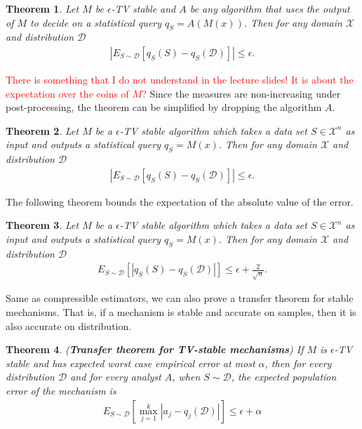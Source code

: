 \documentclass[]{article}
\newtheorem{theorem}{Theorem}[section]
\begin{document}
\begin{theorem}
	Let $M$ be $\epsilon$-TV stable and $A$ be any algorithm that uses the output of $M$ to decide on a statistical query $q_S=A(M(x))$. Then for any domain $\mathcal{X}$ and distribution $\mathcal{D}$
	\begin{align*}
		|E_{S \sim \mathcal{D}}[q_S(S) - q_S(\mathcal{D})]| \le \epsilon.
	\end{align*}
\end{theorem}

\textcolor{red}{There is something that I do not understand in the lecture slides! It is about the expectation over the coins of $M$?} Since the measures are non-increasing under post-processing, the theorem can be simplified by dropping the algorithm $A$. 

\begin{theorem}
	Let $M$ be a $\epsilon$-TV stable algorithm which takes a data set $S \in \mathcal{X}^n$ as input and outputs a statistical query $q_S=M(x)$. Then for any domain $\mathcal{X}$ and distribution $\mathcal{D}$
	\begin{align*}
	|E_{S \sim \mathcal{D}}[q_S(S) - q_S(\mathcal{D})]| \le \epsilon.
	\end{align*}
\end{theorem}

The following theorem bounds the expectation of the absolute value of the error.

\begin{theorem}
	Let $M$ be a $\epsilon$-TV stable algorithm which takes a data set $S \in \mathcal{X}^n$ as input and outputs a statistical query $q_S=M(x)$. Then for any domain $\mathcal{X}$ and distribution $\mathcal{D}$
	\begin{align*}
	E_{S \sim \mathcal{D}}[|q_S(S) - q_S(\mathcal{D})|] \le \epsilon + \frac{2}{\sqrt{n}}.
	\end{align*}
\end{theorem}

Same as compressible estimators, we can also prove a transfer theorem for stable mechanisms. That is, if a mechanism is stable and accurate on samples, then it is also accurate on distribution. 

\begin{theorem} (\textbf{Transfer theorem for TV-stable mechanisms})
	If $M$ is $\epsilon$-TV stable and has expected worst case empirical error at most $\alpha$, then for every distribution $\mathcal{D}$ and for every analyst $A$, when $S \sim \mathcal{D}$, the expected population error of the mechanism is 
	\begin{align*}
		E_{S \sim \mathcal{D}}\left[\max_{j=1}^k |a_j - q_j(\mathcal{D})|\right] \le \epsilon+\alpha
	\end{align*}
\end{theorem}
\end{document}

